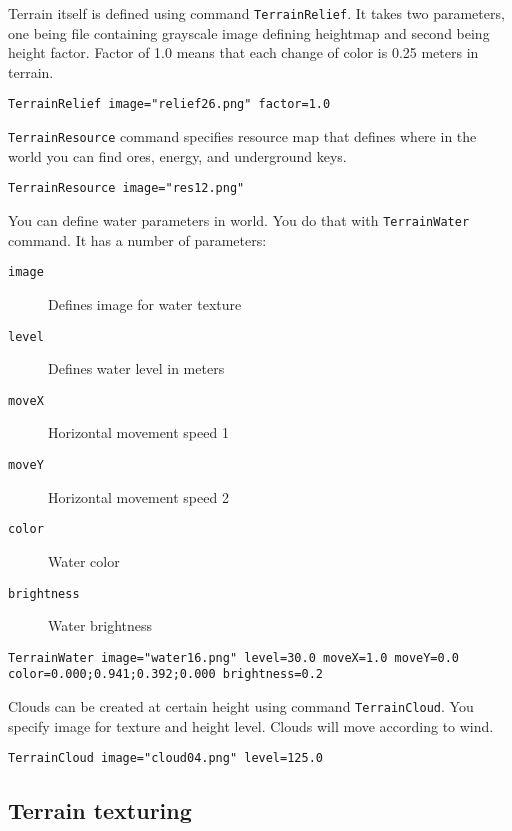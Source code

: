 Terrain itself is defined using command \texttt{TerrainRelief}. It takes two parameters, one being file containing grayscale image defining heightmap and second being height factor. Factor of 1.0 means that each change of color is 0.25 meters in terrain.

\begin{verbatim}
TerrainRelief image="relief26.png" factor=1.0
\end{verbatim}

\texttt{TerrainResource} command specifies resource map that defines where in the world you can find ores, energy, and underground keys.

\begin{verbatim}
TerrainResource image="res12.png"
\end{verbatim}

You can define water parameters in world. You do that with \texttt{TerrainWater} command. It has a number of parameters:

\begin{description}
    \item[\texttt{image}] Defines image for water texture
    \item[\texttt{level}] Defines water level in meters
    \item[\texttt{moveX}] Horizontal movement speed 1
    \item[\texttt{moveY}] Horizontal movement speed 2
    \item[\texttt{color}] Water color
    \item[\texttt{brightness}] Water brightness
\end{description}

\begin{verbatim}
TerrainWater image="water16.png" level=30.0 moveX=1.0 moveY=0.0 color=0.000;0.941;0.392;0.000 brightness=0.2
\end{verbatim}

Clouds can be created at certain height using command \texttt{TerrainCloud}. You specify image for texture and height level. Clouds will move according to wind.

\begin{verbatim}
TerrainCloud image="cloud04.png" level=125.0
\end{verbatim}


\subsection{Terrain texturing}

